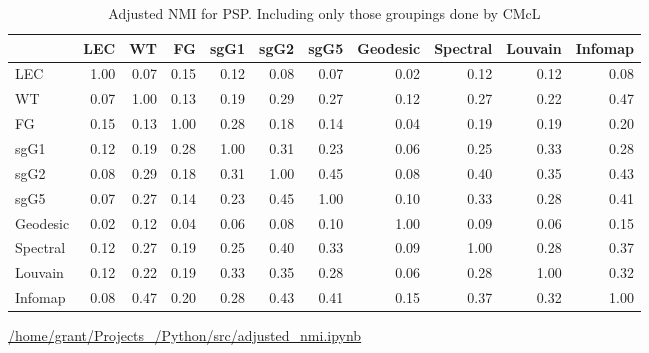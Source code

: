 \begin{table}[ht]
\centering
\begin{adjustbox}{width=\textwidth}

\setlength{\extrarowheight}{2pt}
\begin{tabular}{lrrrrrrrrrr}
\toprule
{} &  LEC &   WT &   FG &  sgG1 &  sgG2 &  sgG5 &  Geodesic &  Spectral &  Louvain &  Infomap \\
\midrule
LEC      & 1.00 & 0.07 & 0.15 &  0.12 &  0.08 &  0.07 &      0.02 &      0.12 &      0.12 &     0.08 \\
WT      & 0.07 & 1.00 & 0.13 &  0.19 &  0.29 &  0.27 &      0.12 &      0.27 &      0.22 &     0.47 \\
FG       & 0.15 & 0.13 & 1.00 &  0.28 &  0.18 &  0.14 &      0.04 &      0.19 &      0.19 &     0.20 \\
sgG1     & 0.12 & 0.19 & 0.28 &  1.00 &  0.31 &  0.23 &      0.06 &      0.25 &      0.33 &     0.28 \\
sgG2     & 0.08 & 0.29 & 0.18 &  0.31 &  1.00 &  0.45 &      0.08 &      0.40 &      0.35 &     0.43 \\
sgG5     & 0.07 & 0.27 & 0.14 &  0.23 &  0.45 &  1.00 &      0.10 &      0.33 &      0.28 &     0.41 \\
Geodesic & 0.02 & 0.12 & 0.04 &  0.06 &  0.08 &  0.10 &      1.00 &      0.09 &      0.06 &     0.15 \\
Spectral & 0.12 & 0.27 & 0.19 &  0.25 &  0.40 &  0.33 &      0.09 &      1.00 &      0.28 &     0.37 \\
Louvain & 0.12 & 0.22 & 0.19 &  0.33 &  0.35 &  0.28 &      0.06 &      0.28 &      1.00 &     0.32 \\
Infomap  & 0.08 & 0.47 & 0.20 &  0.28 &  0.43 &  0.41 &      0.15 &      0.37 &      0.32 &     1.00 \\
\bottomrule
\end{tabular}
\end{adjustbox}
\caption{Adjusted NMI for PSP. Including only those groupings done by CMcL}
\tiny\url{/home/grant/Projects_/Python/src/adjusted_nmi.ipynb}
\label{tab:adjusted NMI for PSP}
\end{table}














